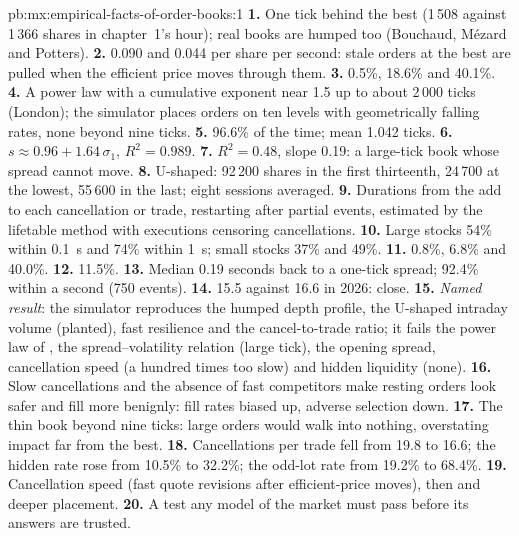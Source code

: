 \begin{solution}{pb:mx:empirical-facts-of-order-books:1}
\textbf{1.} One tick behind the best (1\,508 against 1\,366 shares in chapter~1's hour); real books are humped too (Bouchaud, Mézard and Potters).
\textbf{2.} 0.090 and 0.044 per share per second: stale orders at the best are pulled when the efficient price moves through them.
\textbf{3.} 0.5\%, 18.6\% and 40.1\%.
\textbf{4.} A power law with a cumulative exponent near 1.5 up to about 2\,000 ticks (London); the simulator places orders on ten levels with geometrically
falling rates, none beyond nine ticks.
\textbf{5.} 96.6\% of the time; mean 1.042 ticks.
\textbf{6.} $s\approx0.96+1.64\,\sigma_1$, $R^2=0.989$.
\textbf{7.} $R^2=0.48$, slope 0.19: a large-tick book whose spread cannot move.
\textbf{8.} U-shaped: 92\,200 shares in the first thirteenth, 24\,700 at the lowest, 55\,600 in the last; eight sessions averaged.
\textbf{9.} Durations from the add to each cancellation or trade, restarting after partial events, estimated by the lifetable method with executions censoring
cancellations.
\textbf{10.} Large stocks 54\% within 0.1~s and 74\% within 1~s; small stocks 37\% and 49\%.
\textbf{11.} 0.8\%, 6.8\% and 40.0\%.
\textbf{12.} 11.5\%.
\textbf{13.} Median 0.19 seconds back to a one-tick spread; 92.4\% within a second (750 events).
\textbf{14.} 15.5 against 16.6 in 2026: close.
\textbf{15.} \emph{Named result}: the simulator reproduces the humped depth profile, the U-shaped intraday volume (planted), fast resilience and the
cancel-to-trade ratio; it fails the power law of , the spread--volatility relation (large tick), the opening spread, cancellation
speed (a hundred times too slow) and hidden liquidity (none).
\textbf{16.} Slow cancellations and the absence of fast competitors make resting orders look safer and fill more benignly: fill rates biased up, adverse
selection down.
\textbf{17.} The thin book beyond nine ticks: large orders would walk into nothing, overstating impact far from the best.
\textbf{18.} Cancellations per trade fell from 19.8 to 16.6; the hidden rate rose from 10.5\% to 32.2\%; the odd-lot rate from 19.2\% to 68.4\%.
\textbf{19.} Cancellation speed (fast quote revisions after efficient-price moves), then  and deeper placement.
\textbf{20.} A test any model of the market must pass before its answers are trusted.
\end{solution}


